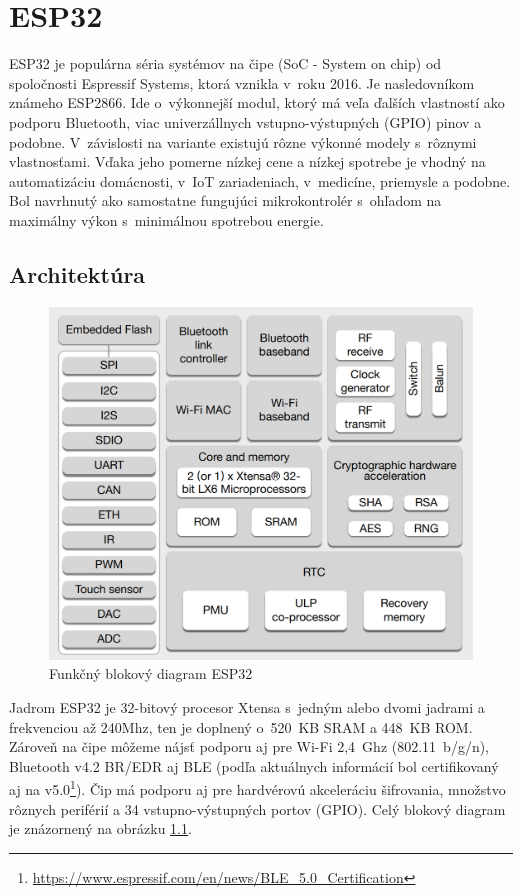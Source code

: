 \chapter{ESP32}

ESP32 je populárna séria systémov na čipe (SoC - System on chip) od spoločnosti Espressif Systems, ktorá vznikla v~roku 2016. Je nasledovníkom známeho ESP2866. Ide o~výkonnejší modul, ktorý má veľa ďalších vlastností ako podporu Bluetooth, viac univerzállnych vstupno-výstupných (GPIO) pinov a podobne. V~závislosti na variante existujú rôzne výkonné modely s~rôznymi vlastnosťami.
Vďaka jeho pomerne nízkej cene a nízkej spotrebe je vhodný na automatizáciu domácnosti, v~IoT zariadeniach, v~medicíne, priemysle a podobne. Bol navrhnutý ako samostatne fungujúci mikrokontrolér s~ohľadom na maximálny výkon s~minimálnou spotrebou energie.

\section{Architektúra}

\begin{figure}[ht]
    \centering
    \includegraphics[scale=0.3]{obrazky-figures/esp32_diagram.png}
    \caption[Funkčný blokový diagram ESP32]{Funkčný blokový diagram ESP32\cite{esp-datasheet}}
    \label{fig:esp_diagram}
\end{figure}

Jadrom ESP32 je 32-bitový procesor Xtensa s~jedným alebo dvomi jadrami a frekvenciou až 240Mhz, ten je doplnený o~520~KB SRAM a 448~KB ROM. Zároveň na čipe môžeme nájsť podporu aj pre Wi-Fi 2,4~Ghz (802.11~b/g/n), Bluetooth v4.2 BR/EDR aj BLE (podľa aktuálnych informácií bol certifikovaný aj na v5.0\footnote{\url{https://www.espressif.com/en/news/BLE_5.0_Certification}}).
Čip má podporu aj pre hardvérovú akceleráciu šifrovania, množstvo rôznych periférií a 34 vstupno-výstupných portov (GPIO). Celý blokový diagram je znázornený na obrázku \ref{fig:esp_diagram}.\cite{esp-datasheet}


